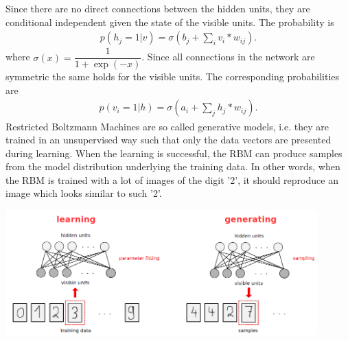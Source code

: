 \documentclass[a4paper]{scrartcl}
\begin{document}
Since there are no direct connections between the hidden units, they are conditional independent given the state of the visible units. The probability is
\begin{align}
p(h_j = 1|v) = \sigma(b_j + \sum_i v_i*w_{ij}).
\end{align}
where $\sigma(x) = \dfrac{1}{1+\exp(-x)}$. Since all connections in the network are symmetric the same holds for the visible units. The corresponding probabilities are
\begin{align}
p(v_i = 1|h) = \sigma(a_i + \sum_j h_j*w_{ij}).
\end{align}
Restricted Boltzmann Machines are so called generative models, i.e. they are trained in an unsupervised way such that only the data vectors are presented during learning. When the learning is successful, the RBM can produce samples from the model distribution underlying the training data. In other words, when the RBM is trained with a lot of images of the digit '2', it should reproduce an image which looks similar to such '2'.
\begin{center}
\includegraphics[width=12cm]{images/generativeRBM.png}
\end{center}
\end{document}
